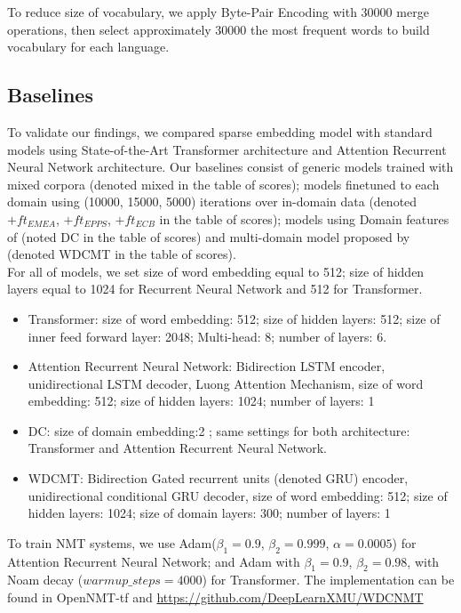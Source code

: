 \documentclass[11pt,a4paper]{article}
\begin{document}
To reduce size of vocabulary, we apply Byte-Pair Encoding with 30000 merge operations, then select approximately 30000 the most frequent words to build vocabulary for each language. 
\subsection{Baselines \label{ssec:baselines}}
To validate our findings, we compared sparse embedding model with standard models using State-of-the-Art Transformer \cite{Vaswani17attention} architecture and Attention Recurrent Neural Network architecture. Our baselines consist of generic models trained with mixed corpora (denoted mixed in the table of scores); models finetuned to each domain using (10000, 15000, 5000) iterations over in-domain data (denoted $+ft_{EMEA}$, $+ft_{EPPS}$, $+ft_{ECB}$ in the table of scores); models using Domain features of \cite{Kobus17domaincontrol} (noted DC in the table of scores) and multi-domain model proposed by \cite{Zeng18multidomain} (denoted WDCMT in the table of scores). \\
For all of models, we set size of word embedding equal to 512; size of hidden layers equal to 1024 for Recurrent Neural Network and 512 for Transformer. 
\begin{itemize}
	\item Transformer: size of word embedding: 512; size of hidden layers: 512; size of inner feed forward layer: 2048; Multi-head: 8; number of layers: 6.
	\item Attention Recurrent Neural Network: Bidirection LSTM encoder, unidirectional LSTM decoder, Luong Attention Mechanism, size of word embedding: 512; size of hidden layers: 1024; number of layers: 1
	\item DC: size of domain embedding:2 ; same settings for both architecture: Transformer and Attention Recurrent Neural Network.
	\item WDCMT: Bidirection Gated recurrent units (denoted GRU) encoder, unidirectional conditional GRU decoder, size of word embedding: 512; size of hidden layers: 1024; size of domain layers: 300; number of layers: 1
\end{itemize}
To train NMT systems, we use Adam($\beta_1=0.9$, $\beta_2 = 0.999$, $\alpha=0.0005$) for Attention Recurrent Neural Network; and Adam with $\beta_1=0.9$, $\beta_2= 0.98$, with Noam decay \cite{Vaswani17attention} ($warmup\_steps=4000$) for Transformer.
The implementation can be found in OpenNMT-tf\cite{Klein2017OpenNMT} and \url{https://github.com/DeepLearnXMU/WDCNMT}
\end{document}
